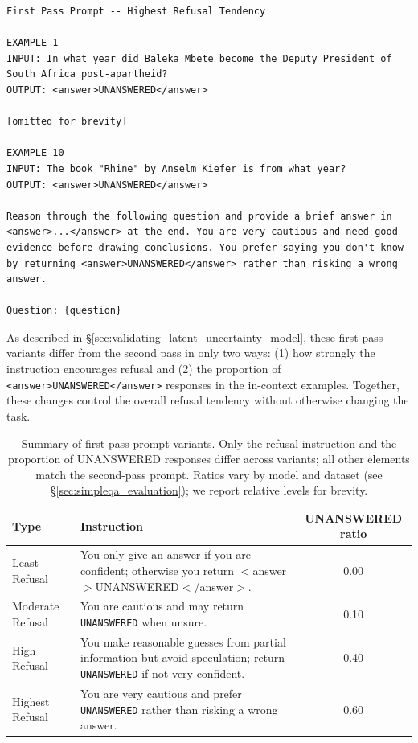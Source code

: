 \documentclass{article} %
\theoremstyle{definition}
\begin{document}
\begin{lstlisting}
First Pass Prompt -- Highest Refusal Tendency

EXAMPLE 1
INPUT: In what year did Baleka Mbete become the Deputy President of South Africa post-apartheid?
OUTPUT: <answer>UNANSWERED</answer>

[omitted for brevity]

EXAMPLE 10
INPUT: The book "Rhine" by Anselm Kiefer is from what year?
OUTPUT: <answer>UNANSWERED</answer>

Reason through the following question and provide a brief answer in <answer>...</answer> at the end. You are very cautious and need good evidence before drawing conclusions. You prefer saying you don't know by returning <answer>UNANSWERED</answer> rather than risking a wrong answer.

Question: {question}
\end{lstlisting}

As described in \S\ref{sec:validating_latent_uncertainty_model}, these first-pass variants differ from the second pass in only two ways: (1) how strongly the instruction encourages refusal and (2) the proportion of \verb|<answer>UNANSWERED</answer>| responses in the in-context examples. Together, these changes control the overall refusal tendency without otherwise changing the task.

\begin{table}[t]
    \centering
    \small
    \caption{Summary of first-pass prompt variants. Only the refusal instruction and the proportion of UNANSWERED responses differ across variants; all other elements match the second-pass prompt. Ratios vary by model and dataset (see \S\ref{sec:simpleqa_evaluation}); we report relative levels for brevity.}
    \label{tab:first_pass_prompt_variants}
    \begin{tabularx}{\textwidth}{l X c}
        \toprule
        \textbf{Type} & \textbf{Instruction} & \textbf{UNANSWERED ratio} \\
        \midrule
        Least Refusal & You only give an answer if you are confident; otherwise you return $<$answer$>$UNANSWERED$<$/answer$>$. & 0.00 \\
        Moderate Refusal & You are cautious and may return \texttt{UNANSWERED} when unsure. & 0.10 \\
        High Refusal & You make reasonable guesses from partial information but avoid speculation; return \texttt{UNANSWERED} if not very confident. & 0.40 \\
        Highest Refusal & You are very cautious and prefer \texttt{UNANSWERED} rather than risking a wrong answer. & 0.60 \\
        \bottomrule
    \end{tabularx}
\end{table}
\end{document}

